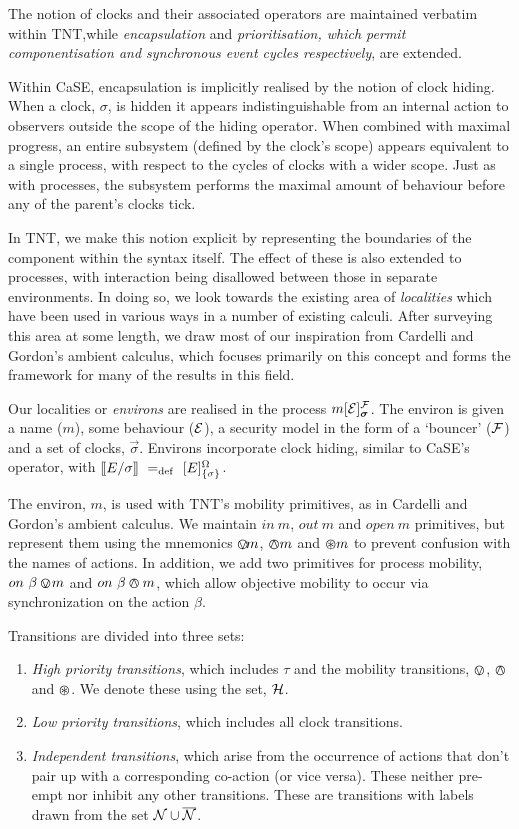 \documentclass[orivec,envcountsame]{llncs}
\begin{document}
The notion of clocks and their associated operators are maintained
verbatim within TNT,while \emph{encapsulation} and
\emph{prioritisation, which permit componentisation and synchronous
event cycles respectively}, are extended.

Within CaSE, encapsulation is implicitly realised by the notion of clock
hiding.  When a clock, $\sigma$, is hidden it appears indistinguishable
from an internal action to observers outside the scope of the hiding
operator.  When combined with maximal progress, an entire subsystem
(defined by the clock's scope) appears equivalent to a single process,
with respect to the cycles of clocks with a wider scope.  Just as with
processes, the subsystem performs the maximal amount of behaviour before
any of the parent's clocks tick.

In TNT, we make this notion explicit by representing the boundaries of
the component within the syntax itself.  The effect of these is also
extended to processes, with interaction being disallowed between those
in separate environments.  In doing so, we look towards the existing
area of \emph{localities} \cite{obslocal,pawl} which have been used in
various ways in a number of existing calculi.  After surveying this area
at some length, we draw most of our inspiration from Cardelli and
Gordon's ambient calculus, which focuses primarily on this concept and
forms the framework for many of the results in this field.

Our localities or \emph{environs} are realised in the process
$\locv{m}{\expr}{\exprb}{\vec{\sigma}}$.  The environ is given a name
($m$), some behaviour ($\text{$\mathcal{E}$}$), a security model in the form of a
`bouncer' ($\text{$\mathcal{F}$}$) and a set of clocks, $\vec{\sigma}$.  Environs incorporate clock hiding,
similar to CaSE's operator, with $[\hspace{-0.3ex}[ E / {\sigma} ]\hspace{-0.3ex}] \mathrel{~=_\mathrm{def}~} {}[ E ]^{\Omega}_{\{\sigma\}}$.

The environ, $m$, is used with TNT's mobility primitives, as in Cardelli
and Gordon's ambient calculus.  We maintain $in\ m$, $out\ m$ and $open\
m$ primitives, but represent them using the mnemonics $\varovee\!m$,
$\varowedge m$ and $\varoast m$ to prevent confusion with the names of
actions.  In addition, we add two primitives for process mobility,
$on\ \beta \varovee\!m$ and $on\ \beta \varowedge m$, which allow objective
mobility to occur via synchronization on the action $\beta$.

Transitions are divided into three sets:

\begin{enumerate}
\item \emph{High priority transitions}, which includes $\tau$ and
      the mobility transitions, $\varovee$, $\varowedge$ and $\varoast$.  We denote
      these using the set, $\text{$\mathcal{H}$}$.
\item \emph{Low priority transitions}, which includes all
      clock transitions.
\item \emph{Independent transitions}, which arise from the occurrence of
      actions that don't pair up with a corresponding co-action (or
      vice versa).  These neither pre-empt nor inhibit any other
      transitions.  These are transitions with labels drawn from the set
      $\text{$\mathcal{N}$} \cup \text{$\overline{\text{$\mathcal{N}$}}$}$.
\end{enumerate}
\end{document}
